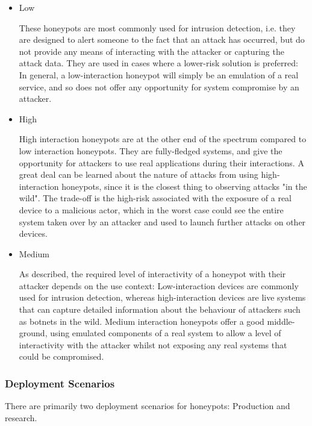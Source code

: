 \begin{itemize}
	\item Low
	
	These honeypots are most commonly used for intrusion detection, i.e. they are designed to alert someone to the fact that an attack has occurred, but do not provide any means of interacting with the attacker or capturing the attack data. They are used in cases where a lower-risk solution is preferred: In general, a low-interaction honeypot will simply be an emulation of a real service, and so does not offer any opportunity for system compromise by an attacker.
	
	\item High
	
	High interaction honeypots are at the other end of the spectrum compared to low interaction honeypots. They are fully-fledged systems, and give the opportunity for attackers to use real applications during their interactions. A great deal can be learned about the nature of attacks from using high-interaction honeypots, since it is the closest thing to observing attacks "in the wild". The trade-off is the high-risk associated with the exposure of a real device to a malicious actor, which in the worst case could see the entire system taken over by an attacker and used to launch further attacks on other devices.
	
	\item Medium
	
	As described, the required level of interactivity of a honeypot with their attacker depends on the use context: Low-interaction devices are commonly used for intrusion detection, whereas high-interaction devices are live systems that can capture detailed information about the behaviour of attackers such as botnets in the wild. Medium interaction honeypots offer a good middle-ground, using emulated components of a real system to allow a level of interactivity with the attacker whilst not exposing any real systems that could be compromised.
	
	
\end{itemize}



\subsubsection{Deployment Scenarios}
There are primarily two deployment scenarios for honeypots: Production and research.

